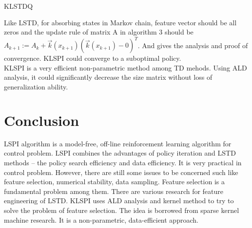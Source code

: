 \begin{algorithm}[H]
\caption{KLSTDQ}
\label{alg:KLSTDQ}
\begin{algorithmic}
	\STATE {}
	\ENDIF
	\ENDFOR
	\STATE {}		
	\ENDFOR		
	\RETURN { $\alpha^\pi$}		
\end{algorithmic}
\end{algorithm}
\noindent
Like LSTD, for absorbing states in Markov chain, feature vector should be all zeros and the update rule of matrix A in algorithm 3 should be $A_{k+1} := A_k + \vec k(x_{k+1}) (\vec k(x_{k+1}) - 0 )^T$. And \cite{xu2007kernel} gives the analysis and proof of convergence. KLSPI could converge to a suboptimal policy.\\
KLSPI is a very efficient non-parametric method among TD mehods. Using ALD analysis, it could significantly decrease the size matrix without loss of generalization ability.

\section{Conclusion}
LSPI algorithm is a model-free, off-line reinforcement learning algorithm for control problem. LSPI combines the advantages of policy iteration and LSTD methods -- the policy search efficiency and data efficiency. It is very practical in control problem. However, there are still some issues to be concerned such like feature selection, numerical stability, data sampling. Feature selection is a fundamental problem among them. There are various research for feature engineering of LSTD.  KLSPI uses ALD analysis and kernel method to try to solve the problem of feature selection. The idea is borrowed from sparse kernel machine research. It is a non-parametric, data-efficient approach. 





